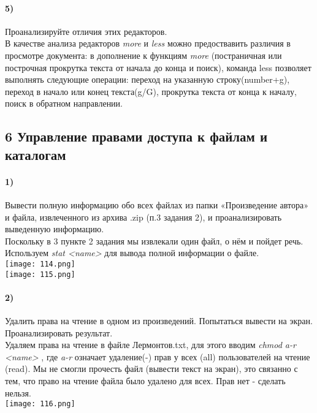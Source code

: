 		\paragraph{5)}
		Проанализируйте отличия этих редакторов. 
		\\
		В качестве анализа редакторов \textit{more} и \textit{less} можно 				предоствавить различия в просмотре документа: в дополнение к функциям 				\textit{more}  (постраничная или построчная прокрутка текста от начала до конца 	и поиск), команда less позволяет выполнять следующие операции: переход на 			указанную строку(number+g), переход в начало или  конец текста(g/G), прокрутка 		текста от конца к началу, поиск в обратном направлении.\\
		
	\subsection*{6 Управление правами доступа к файлам и каталогам}
	
		\paragraph{1)}
		Вывести полную информацию обо всех файлах из папки «Произведение автора» и файла, извлеченного из архива .zip (п.3 задания 2), и проанализировать выведенную информацию. 
		\\
		Поскольку в 3 пункте 2 задания мы извлекали один файл, о нём и пойдет речь. 	Используем \textit{stat <name>} для вывода полной информации о файле. \\
	\texttt{[image: 114.png]}
	\\
	\texttt{[image: 115.png]}
	\\
		\paragraph{2)}
		Удалить права на чтение в одном из произведений. Попытаться вывести на экран. Проанализировать результат. 
		\\
		Удаляем права на чтение в файле Лермонтов.txt, для 			этого вводим \textit{chmod a-r <name> }, где \textit{a-r} означает удаление(-) 		прав у всех (all)  пользователей на чтение (read). Мы не смогли прочесть файл (вывести текст на экран), это связанно с тем, что право на чтение файла было удалено для всех. 
	Прав нет - сделать нельзя.\\
	\texttt{[image: 116.png]}
	\\
